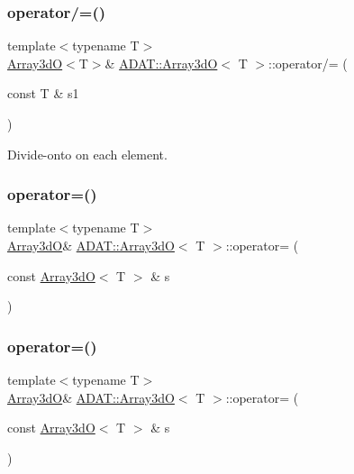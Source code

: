 \subsubsection{\texorpdfstring{operator/=()}{operator/=()}\hspace{0.1cm}{\footnotesize\ttfamily [6/6]}}
{\footnotesize\ttfamily template$<$typename T$>$ \\
\mbox{\hyperlink{classADAT_1_1Array3dO}{Array3dO}}$<$T$>$\& \mbox{\hyperlink{classADAT_1_1Array3dO}{A\+D\+A\+T\+::\+Array3dO}}$<$ T $>$\+::operator/= (\begin{DoxyParamCaption}\item[{const T \&}]{s1 }\end{DoxyParamCaption})\hspace{0.3cm}{\ttfamily [inline]}}



Divide-\/onto on each element. 

\mbox{\label{classADAT_1_1Array3dO_a11d4d9d221d7e6598675307926a38f4f}} 
\subsubsection{\texorpdfstring{operator=()}{operator=()}\hspace{0.1cm}{\footnotesize\ttfamily [1/6]}}
{\footnotesize\ttfamily template$<$typename T$>$ \\
\mbox{\hyperlink{classADAT_1_1Array3dO}{Array3dO}}\& \mbox{\hyperlink{classADAT_1_1Array3dO}{A\+D\+A\+T\+::\+Array3dO}}$<$ T $>$\+::operator= (\begin{DoxyParamCaption}\item[{const \mbox{\hyperlink{classADAT_1_1Array3dO}{Array3dO}}$<$ T $>$ \&}]{s }\end{DoxyParamCaption})\hspace{0.3cm}{\ttfamily [inline]}}

\mbox{\label{classADAT_1_1Array3dO_a11d4d9d221d7e6598675307926a38f4f}} 
\subsubsection{\texorpdfstring{operator=()}{operator=()}\hspace{0.1cm}{\footnotesize\ttfamily [2/6]}}
{\footnotesize\ttfamily template$<$typename T$>$ \\
\mbox{\hyperlink{classADAT_1_1Array3dO}{Array3dO}}\& \mbox{\hyperlink{classADAT_1_1Array3dO}{A\+D\+A\+T\+::\+Array3dO}}$<$ T $>$\+::operator= (\begin{DoxyParamCaption}\item[{const \mbox{\hyperlink{classADAT_1_1Array3dO}{Array3dO}}$<$ T $>$ \&}]{s }\end{DoxyParamCaption})\hspace{0.3cm}{\ttfamily [inline]}}

